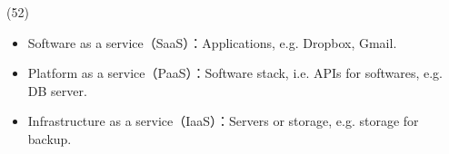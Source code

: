 \begin{theorem}{(52)} \quad\quad \begin{itemize}
        \item Software as a service（SaaS）：Applications, e.g. Dropbox, Gmail.
        \item Platform as a service（PaaS）：Software stack, i.e. APIs for softwares, e.g. DB server.
        \item Infrastructure as a service（IaaS）：Servers or storage, e.g. storage for backup.
    \end{itemize}
\end{theorem}

